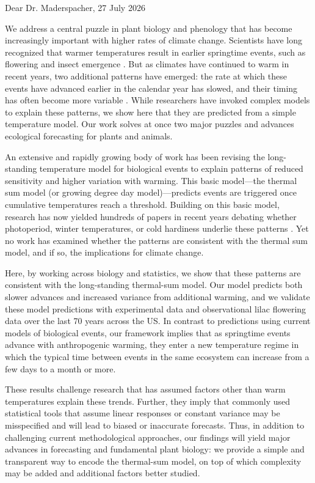 \documentclass{article}
\begin{document}
\thispagestyle{empty}
Dear Dr. Maderspacher, \hfill 27 July 2026   \newline \vspace{-.75em}

We address a central puzzle in plant biology and phenology that has become increasingly important with higher rates of climate change. Scientists have long recognized that warmer temperatures result in earlier springtime events, such as flowering and insect emergence \citep{Root:2003kl}. But as climates have continued to warm in recent years, two additional patterns have emerged: the rate at which these events have advanced earlier in the calendar year has slowed, and their timing has often become more variable  \citep{fu2015declining,vitasse2022great,chuine2025living}. While researchers have invoked complex models to explain these patterns, we show here that they are predicted from a simple temperature model. Our work solves at once two major puzzles and advances ecological forecasting for plants and animals. 

An extensive and rapidly growing body of work has been revising the long-standing temperature model for biological events to explain patterns of reduced sensitivity and higher variation with warming. This basic model---the thermal sum model (or growing degree day model)---predicts events are triggered once cumulative temperatures reach a threshold. Building on this basic model, research has now yielded hundreds of papers in recent years debating whether photoperiod, winter temperatures, or cold hardiness underlie these patterns \citep[e.g.,][]{fu2015declining,zohner2016ncc,ospreebbms,kovaleskipreprint}. Yet no work has examined whether the patterns are consistent with the thermal sum model, and if so, the implications for climate change.

Here, by working across biology and statistics, we show that these patterns are consistent with the long-standing thermal-sum model. Our model predicts both slower advances and increased variance from additional warming, and we validate these model predictions with experimental data and observational lilac flowering data over the last 70 years across the US. In contrast to predictions using current models of biological events, our framework implies that as springtime events advance with anthropogenic warming, they enter a new temperature regime in which the typical time between events in the same ecosystem can increase from a few days to a month or more.

These results challenge research that has assumed factors other than warm temperatures explain these trends. Further, they imply that commonly used statistical tools that assume linear responses or constant variance may be misspecified and will lead to biased or inaccurate forecasts. Thus, in addition to challenging current methodological approaches, our findings will yield major advances in forecasting and fundamental plant biology: we provide a simple and transparent way to encode the thermal-sum model, on top of which complexity may be added and additional factors better studied.
\end{document}
